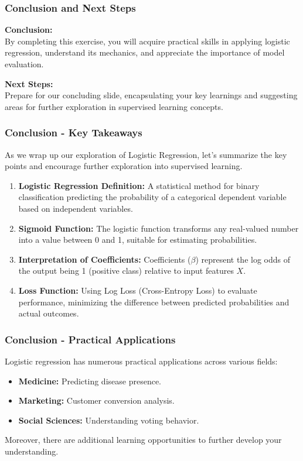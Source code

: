 \documentclass[aspectratio=169]{beamer}
\begin{document}
\begin{frame}
    \frametitle{Conclusion and Next Steps}
    \textbf{Conclusion:} \\
    By completing this exercise, you will acquire practical skills in applying logistic regression, understand its mechanics, and appreciate the importance of model evaluation.
    
    \textbf{Next Steps:} \\
    Prepare for our concluding slide, encapsulating your key learnings and suggesting areas for further exploration in supervised learning concepts.
\end{frame}

\begin{frame}[fragile]
    \frametitle{Conclusion - Key Takeaways}
    As we wrap up our exploration of Logistic Regression, let’s summarize the key points and encourage further exploration into supervised learning.
    
    \begin{enumerate}
        \item \textbf{Logistic Regression Definition:} 
        A statistical method for binary classification predicting the probability of a categorical dependent variable based on independent variables.
        
        \item \textbf{Sigmoid Function:} 
        The logistic function transforms any real-valued number into a value between 0 and 1, suitable for estimating probabilities.
        
        \item \textbf{Interpretation of Coefficients:} 
        Coefficients (\(\beta\)) represent the log odds of the output being 1 (positive class) relative to input features \(X\).
        
        \item \textbf{Loss Function:} 
        Using Log Loss (Cross-Entropy Loss) to evaluate performance, minimizing the difference between predicted probabilities and actual outcomes.
    \end{enumerate}
\end{frame}

\begin{frame}[fragile]
    \frametitle{Conclusion - Practical Applications}
    Logistic regression has numerous practical applications across various fields:

    \begin{itemize}
        \item \textbf{Medicine:} Predicting disease presence.
        \item \textbf{Marketing:} Customer conversion analysis.
        \item \textbf{Social Sciences:} Understanding voting behavior.
    \end{itemize}

    Moreover, there are additional learning opportunities to further develop your understanding.
\end{frame}
\end{document}
